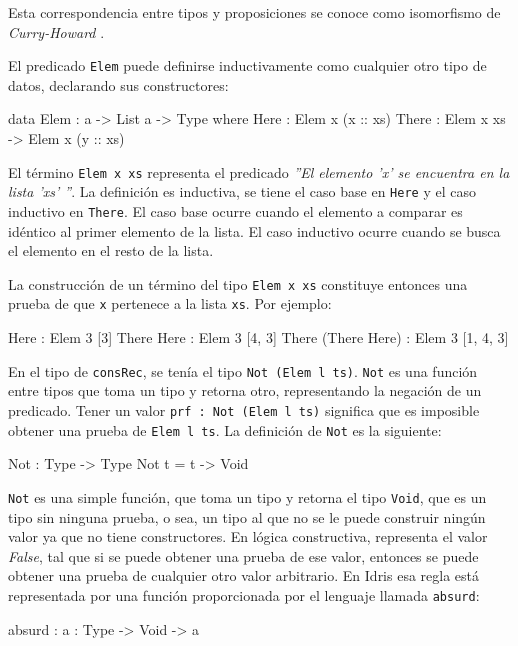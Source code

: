 Esta correspondencia entre tipos y proposiciones se conoce como isomorfismo de \textit{Curry-Howard} \cite{Howard80}.

El predicado \texttt{Elem} puede definirse inductivamente como cualquier otro tipo de datos, declarando sus constructores:

\begin{code}
data Elem : a -> List a -> Type where
  Here : Elem x (x :: xs)
  There : Elem x xs -> Elem x (y :: xs)
\end{code}

El término \texttt{Elem x xs} representa el predicado \textit{''El elemento 'x' se encuentra en la lista 'xs' ''}. La definición es inductiva, se tiene el caso base en \texttt{Here} y el caso inductivo en \texttt{There}. El caso base ocurre cuando el elemento a comparar es idéntico al primer elemento de la lista. El caso inductivo ocurre cuando se busca el elemento en el resto de la lista.

La construcción de un término del tipo \texttt{Elem x xs} constituye entonces una prueba de que \texttt{x} pertenece a la lista \texttt{xs}. Por ejemplo:

\begin{code}
Here : Elem 3 [3]
There Here : Elem 3 [4, 3]
There (There Here) : Elem 3 [1, 4, 3]
\end{code}

En el tipo de \texttt{consRec}, se tenía el tipo \texttt{Not (Elem l ts)}. \texttt{Not} es una función entre tipos que toma un tipo y retorna otro, representando la negación de un predicado. Tener un valor \texttt{prf : Not (Elem l ts)} significa que es imposible obtener una prueba de \texttt{Elem l ts}. La definición de \texttt{Not} es la siguiente:

\begin{code}
Not : Type -> Type
Not t = t -> Void
\end{code}

\texttt{Not} es una simple función, que toma un tipo y retorna el tipo  \texttt{Void}, que es un tipo sin ninguna prueba, o sea, un tipo al que no se le puede construir ningún valor ya que no tiene constructores. En lógica constructiva, representa el valor \textit{False}, tal que si se puede obtener una prueba de ese valor, entonces se puede obtener una prueba de cualquier otro valor arbitrario. En Idris esa regla está representada por una función proporcionada por el lenguaje llamada \texttt{absurd}:

\begin{code}
absurd : {a : Type} -> Void -> a
\end{code}

